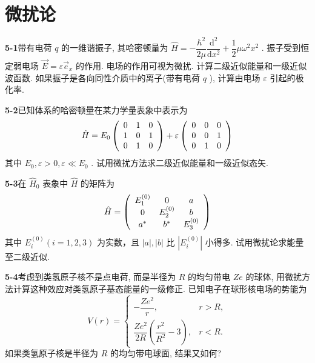 \chapter{微扰论}

\newpage


\textbf{5-1}\quad 带有电荷 $\displaystyle q$ 的一维谐振子, 其哈密顿量为 $\displaystyle \hat{H} = -\dfrac{\hbar^2}{2\mu}\dfrac{\mathrm{d}^2}{\mathrm{d}x^2} + \dfrac{1}{2}\mu \omega^2 x^2$ . 振子受到恒定弱电场 $\displaystyle \vec{E} = \varepsilon \vec{e}_x$ 的作用. 电场的作用可视为微扰. 计算二级近似能量和一级近似波函数. 如果振子是各向同性介质中的离子(带有电荷 $\displaystyle q$ ), 计算由电场 $\displaystyle \varepsilon$ 引起的极化率.

\vfill

\newpage

\textbf{5-2}\quad 已知体系的哈密顿量在某力学量表象中表示为
$$
\hat {H} = E _ {0} \left( \begin{array}{c c c} 0 & 1 & 0 \\ 1 & 0 & 1 \\ 0 & 1 & 0 \end{array} \right) + \varepsilon \left( \begin{array}{c c c} 0 & 0 & 0 \\ 0 & 0 & 1 \\ 0 & 1 & 0 \end{array} \right)
$$
其中 $\displaystyle E_0, \varepsilon > 0, \varepsilon \ll E_0$ . 试用微扰方法求二级近似能量和一级近似态矢.

\vfill

\newpage

\textbf{5-3}\quad 在 $\displaystyle \hat{H}_0$ 表象中 $\displaystyle \hat{H}$ 的矩阵为
$$
\hat {H} = \left( \begin{array}{c c c} E _ {1} ^ {(0)} & 0 & a \\ 0 & E _ {2} ^ {(0)} & b \\ a ^ {*} & b ^ {*} & E _ {3} ^ {(0)} \end{array} \right)
$$
其中 $\displaystyle E_{i}^{(0)}(i = 1,2,3)$ 为实数，且 $\displaystyle \left|a\right|, \left|b\right|$ 比 $\displaystyle \left|E_{i}^{(0)}\right|$ 小得多. 试用微扰论求能量至二级近似.

\vfill

\newpage

\textbf{5-4}\quad 考虑到类氢原子核不是点电荷, 而是半径为 $\displaystyle R$ 的均匀带电 $\displaystyle Ze$ 的球体, 用微扰方法计算这种效应对类氢原子基态能量的一级修正. 已知电子在球形核电场的势能为
\begingroup
\renewcommand{\arraystretch}{1.8}
\[
V(r) = \begin{cases}
-\dfrac{Ze^2}{r}, & r > R, \\[1.5em]
\dfrac{Ze^2}{2R}\left(\dfrac{r^2}{R^2}-3\right), & r < R.
\end{cases}
\]
\endgroup
如果类氢原子核是半径为 $\displaystyle R$ 的均匀带电球面, 结果又如何?

